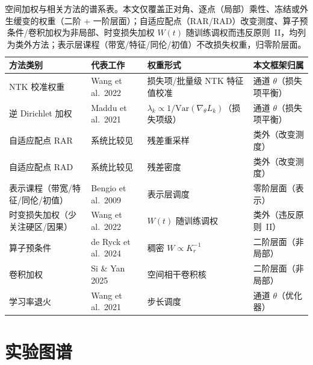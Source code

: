 \documentclass[fontset=windows,11pt]{ctexart}
\newcommand{\W}{W}
\numberwithin{equation}{section}
\begin{document}
\begin{table}[ht]\centering\small\renewcommand{\arraystretch}{1.15}
\begin{tabular}{p{2.8cm}p{3.2cm}p{3.0cm}p{3.5cm}}
\toprule
方法类别 & 代表工作 & 权重形式 & 本文框架归属\\
\midrule
NTK 校准权重 & Wang et al.\ 2022\cite{Wang2020NTK} & 损失项/批量级 NTK 特征值校准 & 通道 $\theta$（损失项平衡）\\
逆 Dirichlet 加权 & Maddu et al.\ 2021\cite{Maddu2021} & $\lambda_k\propto 1/\mathrm{Var}(\nabla_\theta L_k)$（损失项级） & 通道 $\theta$（损失项平衡）\\
自适应配点 RAR & 系统比较见\cite{Wu2022} & 残差重采样 & 类外（改变测度）\\
自适应配点 RAD & 系统比较见\cite{Wu2022} & 残差密度 & 类外（改变测度）\\
表示课程（带宽/特征/同伦/初值） & Bengio et al.\ 2009\cite{Bengio2009} & 表示层调度 & 零阶层面（表示）\\
时变损失加权（少关注硬区/因果） & Wang et al.\ 2022\cite{LessEmphasis2022,Wang2022causal} & $W(t)$ 随训练调权 & 类外（违反原则~II）\\
算子预条件 & de Ryck et al.\ 2024\cite{deRyckOp2024} & 稠密 $\W\propto K_r^{-1}$ & 二阶层面（非局部）\\
卷积加权 & Si \& Yan 2025\cite{SiYan2025} & 空间相干卷积核 & 二阶层面（非局部）\\
学习率退火 & Wang et al.\ 2021\cite{WangTeng2020} & 步长调度 & 通道 $\theta$（优化器）\\
\bottomrule
\end{tabular}
\caption{空间加权与相关方法的谱系表。本文仅覆盖正对角、逐点（局部）乘性、冻结或外生缓变的权重（二阶 + 一阶层面）；自适应配点（RAR/RAD）改变测度、算子预条件/卷积加权为非局部、时变损失加权 $W(t)$ 随训练调权而违反原则~II，均列为类外方法；表示层课程（带宽/特征/同伦/初值）不改损失权重，归零阶层面。}\label{tab:lineage}
\end{table}

\section{实验图谱}\label{app:atlas}
\end{document}
